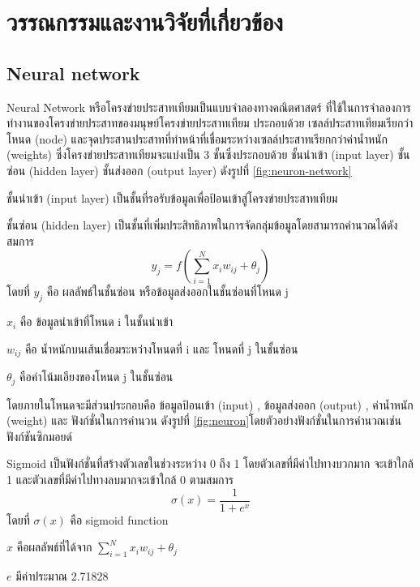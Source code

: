 \chapter{วรรณกรรมและงานวิจัยที่เกี่ยวข้อง}
\label{literature}
%
\section{Neural network \cite{Neuron}}
Neural Network หรือโครงข่ายประสาทเทียมเป็นแบบจำลองทางคณิตศาสตร์
ที่ใช้ในการจำลองการทำงานของโครงข่ายประสาทของมนุษย์โครงข่ายประสาทเทียม ประกอบด้วย เซลล์ประสาทเทียมเรียกว่าโหนด (node) และจุดประสานประสาทที่ทำหน้าที่เชื่อมระหว่างเซลล์ประสาทเรียกกว่าค่าน้ำหนัก (weights) ซึ่งโครงข่ายประสาทเทียมจะแบ่งเป็น 3 ชั้นซึ่งประกอบด้วย ชั้นนำเข้า (input layer) ชั้นซ่อน (hidden layer) ชั้นส่งออก (output layer) ดังรูปที่ \ref{fig:neuron-network}

ชั้นนำเข้า (input layer) เป็นชั้นที่รอรับข้อมูลเพื่อป้อนเข้าสู่โครงข่ายประสาทเทียม

ชั้นซ่อน (hidden layer) เป็นชั้นที่เพิ่มประสิทธิภาพในการจัดกลุ่มข้อมูลโดยสามารถคำนวณได้ดังสมการ
\[y_j = f(\sum_{i=1}^N x_i w_{ij} + \theta_j)\]
โดยที่ \(y_j\) คือ ผลลัพธ์ในชั้นซ่อน หรือข้อมูลส่งออกในชั้นซ่อนที่โหนด j

\(x_i\) คือ ข้อมูลนำเข้าที่โหนด i ในชั้นนำเข้า

\(w_{ij}\) คือ น้ำหนักบนเส้นเชื่อมระหว่างโหนดที่ i และ โหนดที่ j ในชั้นซ่อน

\(\theta_j\) คือค่าโน้มเอียงของโหนด j ในชั้นซ่อน

โดยภายในโหนดจะมีส่วนประกอบคือ
 ข้อมูลป้อนเข้า (input) ,
 ข้อมูลส่งออก (output) ,
 ค่าน้ำหนัก (weight) และ
 ฟังก์ชั่นในการคำนวน ดังรูปที่ \ref{fig:neuron}โดยตัวอย่างฟังก์ชั่นในการคำนวณเช่น ฟังก์ชันซิกมอยด์
 
   Sigmoid เป็นฟังก์ชั่นที่สร้างตัวเลขในช่วงระหว่าง 0 ถึง 1 โดยตัวเลขที่มีค่าไปทางบวกมาก จะเข้าใกล้ 1 และตัวเลขที่มีค่าไปทางลบมากจะเข้าใกล้ 0 ตามสมการ
    \[\sigma(x) = \frac{1}{1+e^x}\]
    โดยที่ \(\sigma(x)\) คือ sigmoid function
    
    \(x\) คือผลลัพธ์ที่ได้จาก \(\sum_{i=1}^N x_i w_{ij} + \theta_j\)

    \(e\) มีค่าประมาณ 2.71828
 
